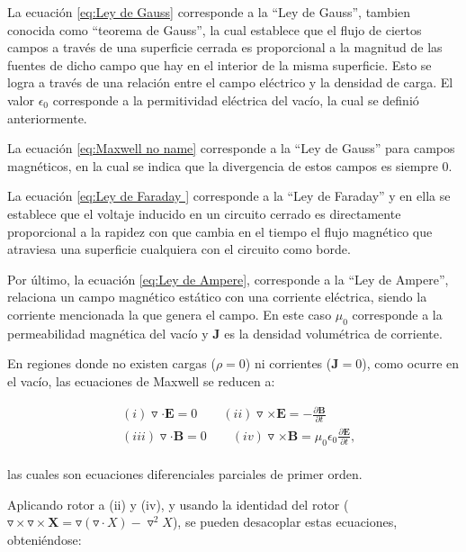 \documentclass[12pt,letterpaper]{article}
\numberwithin{equation}{section}
\begin{document}
La ecuación \ref{eq:Ley de Gauss} corresponde a la ``Ley de Gauss'', tambien conocida como ``teorema de Gauss'', la cual establece que el flujo de ciertos campos a través de una superficie cerrada es proporcional a la magnitud de las fuentes de dicho campo que hay en el interior de la misma superficie. Esto se logra a través de una relación entre el campo eléctrico y la densidad de carga. El valor $\epsilon_0$ corresponde a la permitividad eléctrica del vacío, la cual se definió anteriormente.

La ecuación \ref{eq:Maxwell no name} corresponde a la ``Ley de Gauss'' para campos magnéticos, en la cual se indica que la divergencia de estos campos es siempre 0.

La ecuación \ref{eq:Ley de Faraday } corresponde a la ``Ley de Faraday'' y en ella se establece que el voltaje inducido en un circuito cerrado es directamente proporcional a la rapidez con que cambia en el tiempo el flujo magnético que atraviesa una superficie cualquiera con el circuito como borde.

Por último, la ecuación \ref{eq:Ley de Ampere}, corresponde a la ``Ley de Ampere'', relaciona un campo magnético estático con una corriente eléctrica, siendo la corriente mencionada la que genera el campo. En este caso $\mu_{0}$ corresponde a la permeabilidad magnética del vacío y \textbf{J} es la densidad volumétrica de corriente.

En regiones donde no existen cargas ($\rho = 0$) ni corrientes ($\textbf{J} = 0$), como ocurre en el vacío, las ecuaciones de Maxwell se reducen a:

\begin{equation}
\begin{split}
&(i)\triangledown\cdot\textbf{E} = 0\qquad(ii)\triangledown\times\textbf{E} = -\frac{\partial\textbf{B}}{\partial t}\\
&(iii)\triangledown\cdot\textbf{B} = 0\qquad(iv)\triangledown\times\textbf{B} = \mu_0\epsilon_0\frac{\partial\textbf{E}}{\partial t},
\end{split}
\label{eq: Maxwell_sin_cargas}
\end{equation}
\\
\noindent las cuales son ecuaciones diferenciales parciales de primer orden.
 
Aplicando rotor a (ii) y (iv), y usando la identidad del rotor ($\triangledown\times\triangledown\times\textbf{X}= \triangledown(\triangledown\cdot X)-\triangledown^2X$), se pueden desacoplar estas ecuaciones, obteniéndose:
\end{document}
